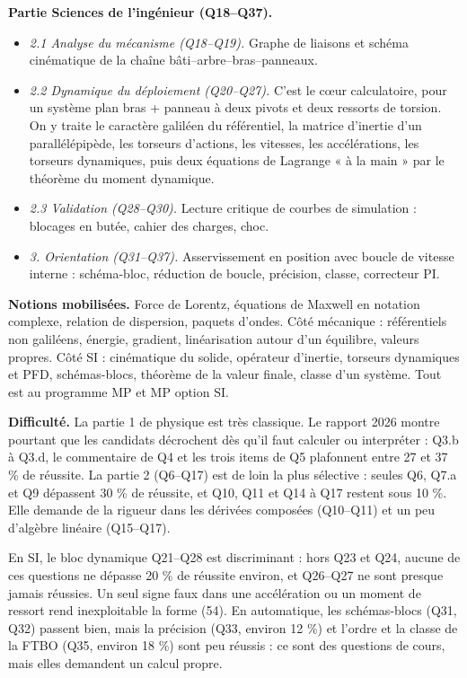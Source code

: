 \documentclass[11pt,a4paper]{article}
\providecommand{\tightlist}{\setlength{\itemsep}{0pt}\setlength{\parskip}{0pt}}
\begin{document}
\textbf{Partie Sciences de l'ingénieur (Q18--Q37).}

\begin{itemize}
\tightlist
\item
  \emph{2.1 Analyse du mécanisme (Q18--Q19).} Graphe de liaisons et schéma cinématique de la chaîne bâti--\allowbreak{}arbre--\allowbreak{}bras--\allowbreak{}panneaux.
\item
  \emph{2.2 Dynamique du déploiement (Q20--Q27).} C'est le cœur calculatoire, pour un système plan bras + panneau à deux pivots et deux ressorts de torsion. On y traite le caractère galiléen du référentiel, la matrice d'inertie d'un parallélépipède, les torseurs d'actions, les vitesses, les accélérations, les torseurs dynamiques, puis deux équations de Lagrange « à la main » par le théorème du moment dynamique.
\item
  \emph{2.3 Validation (Q28--Q30).} Lecture critique de courbes de simulation : blocages en butée, cahier des charges, choc.
\item
  \emph{3. Orientation (Q31--Q37).} Asservissement en position avec boucle de vitesse interne : schéma-bloc, réduction de boucle, précision, classe, correcteur PI.
\end{itemize}

\textbf{Notions mobilisées.} Force de Lorentz, équations de Maxwell en notation complexe, relation de dispersion, paquets d'ondes. Côté mécanique : référentiels non galiléens, énergie, gradient, linéarisation autour d'un équilibre, valeurs propres. Côté SI : cinématique du solide, opérateur d'inertie, torseurs dynamiques et PFD, schémas-blocs, théorème de la valeur finale, classe d'un système. Tout est au programme MP et MP option SI.

\textbf{Difficulté.} La partie 1 de physique est très classique. Le rapport 2026 montre pourtant que les candidats décrochent dès qu'il faut calculer ou interpréter : Q3.b à Q3.d, le commentaire de Q4 et les trois items de Q5 plafonnent entre 27 et 37 \% de réussite. La partie 2 (Q6--Q17) est de loin la plus sélective : seules Q6, Q7.a et Q9 dépassent 30 \% de réussite, et Q10, Q11 et Q14 à Q17 restent sous 10 \%. Elle demande de la rigueur dans les dérivées composées (Q10--Q11) et un peu d'algèbre linéaire (Q15--Q17).

En SI, le bloc dynamique Q21--Q28 est discriminant : hors Q23 et Q24, aucune de ces questions ne dépasse 20 \% de réussite environ, et Q26--Q27 ne sont presque jamais réussies. Un seul signe faux dans une accélération ou un moment de ressort rend inexploitable la forme (54). En automatique, les schémas-blocs (Q31, Q32) passent bien, mais la précision (Q33, environ 12 \%) et l'ordre et la classe de la FTBO (Q35, environ 18 \%) sont peu réussis : ce sont des questions de cours, mais elles demandent un calcul propre.
\end{document}

